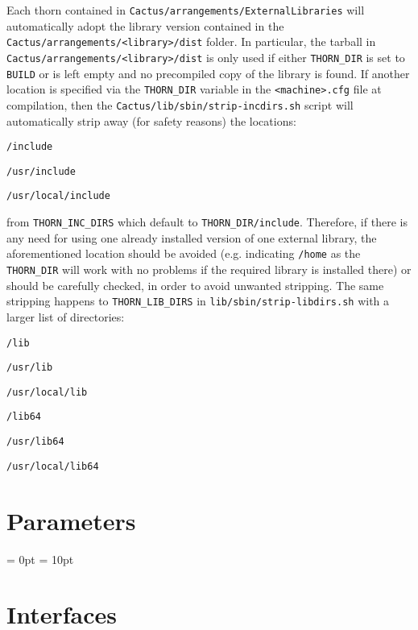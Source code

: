 Each thorn contained in \texttt{Cactus/arrangements/ExternalLibraries} will automatically adopt the library version contained in the \texttt{Cactus/arrangements/<library>/dist} folder. In particular, the tarball in \texttt{Cactus/arrangements/<library>/dist} is only used if either \texttt{THORN\_DIR} is set to \texttt{BUILD} or is left empty and no precompiled copy of the library is found. If another location is specified via the \texttt{THORN\_DIR} variable in the \texttt{<machine>.cfg} file at compilation, then the \texttt{Cactus/lib/sbin/strip-incdirs.sh} script will automatically strip away (for safety reasons) the locations:
\begin{Lentry}
\item [\texttt{/include}]
\item [\texttt{/usr/include}]
\item [\texttt{/usr/local/include}]
\end{Lentry}
from \texttt{THORN\_INC\_DIRS} which default to \texttt{THORN\_DIR/include}. Therefore, if there is any need for using one already installed version of one external library, the aforementioned location should be avoided (e.g. indicating \texttt{/home} as the \texttt{THORN\_DIR} will work with no problems if the required library is installed there) or should be carefully checked, in order to avoid unwanted stripping. The same stripping happens to \texttt{THORN\_LIB\_DIRS} in \texttt{lib/sbin/strip-libdirs.sh} with a larger list of directories:
\begin{Lentry}
\item [\texttt{/lib}]
\item [\texttt{/usr/lib}]
\item [\texttt{/usr/local/lib}]
\item [\texttt{/lib64}]
\item [\texttt{/usr/lib64}]
\item [\texttt{/usr/local/lib64}] 
\end{Lentry}





\section{Parameters} 


\parskip = 0pt
\parskip = 10pt 

\section{Interfaces} 


